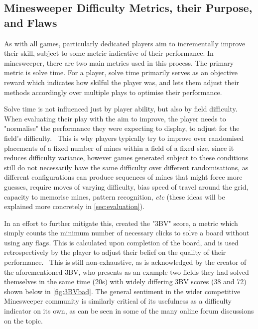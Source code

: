 \subsection{Minesweeper Difficulty Metrics, their Purpose, and Flaws} \label{awa:minesweeperImprovementDrive}
As with all games, particularly dedicated players aim to incrementally improve their skill, subject to some metric indicative of their performance. In minesweeper, there are two main metrics used in this process. The primary metric is solve time. For a player, solve time primarily serves as an objective reward which indicates how skilful the player was, and lets them adjust their methods accordingly over multiple plays to optimise their performance.

Solve time is not influenced just by player ability, but also by field difficulty.
When evaluating their play with the aim to improve, the player needs to "normalise" the performance they were expecting to display, to adjust for the field's difficulty.
\
This is why players typically try to improve over randomised placements of a fixed number of mines within a field of a fixed size, since it reduces difficulty variance, however games generated subject to these conditions still do not necessarily have the same difficulty over different randomisations, as different configurations can produce sequences of mines that might force more guesses, require moves of varying difficulty, bias speed of travel around the grid, capacity to memorise mines, pattern recognition, \textit{etc} (these ideas will be explained more concretely in \cref{sec:evaluation}).

In an effort to further mitigate this, \citet{3BVmetric} created the "3BV" score, a metric which simply counts the minimum number of necessary clicks to solve a board without using any flags. This is calculated upon completion of the board, and is used retrospectively by the player to adjust their belief on the quality of their performance.
\
This is still non-exhaustive, as is acknowledged by the creator of the aforementioned 3BV, who presents as an example two fields they had solved themselves in the same time (20s) with widely differing 3BV scores (38 and 72) shown below in \cref{fig:3BVbad}.
The general sentiment in the wider competitive Minesweeper community is similarly critical of its usefulness as a difficulty indicator on its own, as can be seen in some of the many online forum discussions on the topic\cite{redditComment1, redditComment2, redditComment3}.

